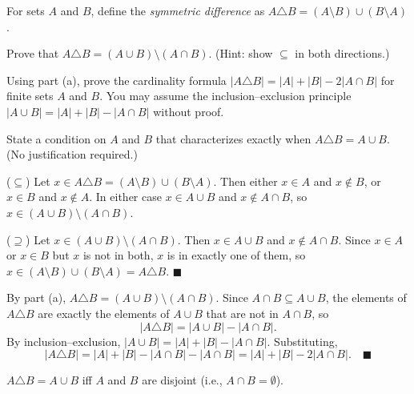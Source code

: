\documentclass[test,letterpaper]{cs20}
\begin{document}


\begin{problem}

For sets $A$ and $B$, define the \emph{symmetric difference} as $A \triangle B = (A \setminus B) \cup (B \setminus A)$.

\subproblem Prove that $A \triangle B = (A \cup B) \setminus (A \cap B)$. (Hint: show $\subseteq$ in both directions.)

\subproblem Using part (a), prove the cardinality formula $|A \triangle B| = |A| + |B| - 2|A \cap B|$ for finite sets $A$ and $B$. You may assume the inclusion--exclusion principle $|A \cup B| = |A| + |B| - |A \cap B|$ without proof.

\subproblem State a condition on $A$ and $B$ that characterizes exactly when $A \triangle B = A \cup B$. (No justification required.)

\begin{solution}
\subsolution ($\subseteq$) Let $x \in A \triangle B = (A \setminus B) \cup (B \setminus A)$. Then either $x \in A$ and $x \notin B$, or $x \in B$ and $x \notin A$. In either case $x \in A \cup B$ and $x \notin A \cap B$, so $x \in (A \cup B) \setminus (A \cap B)$.

($\supseteq$) Let $x \in (A \cup B) \setminus (A \cap B)$. Then $x \in A \cup B$ and $x \notin A \cap B$. Since $x \in A$ or $x \in B$ but $x$ is not in both, $x$ is in exactly one of them, so $x \in (A \setminus B) \cup (B \setminus A) = A \triangle B$. $\blacksquare$

\subsolution By part (a), $A \triangle B = (A \cup B) \setminus (A \cap B)$. Since $A \cap B \subseteq A \cup B$, the elements of $A \triangle B$ are exactly the elements of $A \cup B$ that are not in $A \cap B$, so
\[
|A \triangle B| = |A \cup B| - |A \cap B|.
\]
By inclusion--exclusion, $|A \cup B| = |A| + |B| - |A \cap B|$. Substituting,
\[
|A \triangle B| = |A| + |B| - |A \cap B| - |A \cap B| = |A| + |B| - 2|A \cap B|. \quad \blacksquare
\]

\subsolution $A \triangle B = A \cup B$ iff $A$ and $B$ are disjoint (i.e., $A \cap B = \emptyset$).
\end{solution}

\pagebreak

\end{problem}
\end{document}

